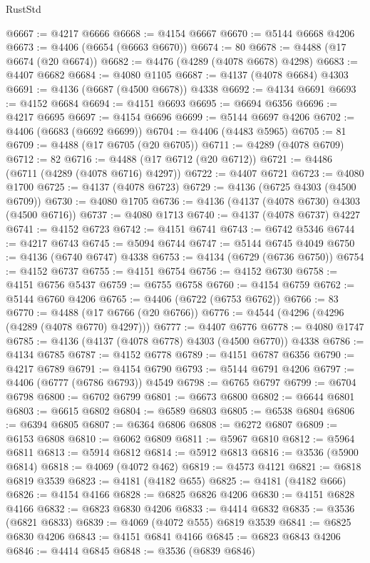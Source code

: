 \begin{lexlean}{RustStd}
\begin{coremodule}
{\begin{coremodule}
{{{{{{{{{{{{{{{{{{{{{{{{{{{{{{{{{{{{{{{{{{{{{{{{{{@6667 := @4217 @6666
@6668 := @4154 @6667
@6670 := @5144 @6668 @4206
@6673 := @4406 (@6654 (@6663 @6670))
@6674 := 80
@6678 := @4488 (@17 @6674 (@20 @6674))
@6682 := @4476 (@4289 (@4078 @6678) @4298)
@6683 := @4407 @6682
@6684 := @4080 @1105
@6687 := @4137 (@4078 @6684) @4303
@6691 := @4136 (@6687 (@4500 @6678)) @4338
@6692 := @4134 @6691
@6693 := @4152 @6684
@6694 := @4151 @6693
@6695 := @6694 @6356
@6696 := @4217 @6695
@6697 := @4154 @6696
@6699 := @5144 @6697 @4206
@6702 := @4406 (@6683 (@6692 @6699))
@6704 := @4406 (@4483 @5965)
@6705 := 81
@6709 := @4488 (@17 @6705 (@20 @6705))
@6711 := @4289 (@4078 @6709)
@6712 := 82
@6716 := @4488 (@17 @6712 (@20 @6712))
@6721 := @4486 (@6711 (@4289 (@4078 @6716) @4297))
@6722 := @4407 @6721
@6723 := @4080 @1700
@6725 := @4137 (@4078 @6723)
@6729 := @4136 (@6725 @4303 (@4500 @6709))
@6730 := @4080 @1705
@6736 := @4136 (@4137 (@4078 @6730) @4303 (@4500 @6716))
@6737 := @4080 @1713
@6740 := @4137 (@4078 @6737) @4227
@6741 := @4152 @6723
@6742 := @4151 @6741
@6743 := @6742 @5346
@6744 := @4217 @6743
@6745 := @5094 @6744
@6747 := @5144 @6745 @4049
@6750 := @4136 (@6740 @6747) @4338
@6753 := @4134 (@6729 (@6736 @6750))
@6754 := @4152 @6737
@6755 := @4151 @6754
@6756 := @4152 @6730
@6758 := @4151 @6756 @5437
@6759 := @6755 @6758
@6760 := @4154 @6759
@6762 := @5144 @6760 @4206
@6765 := @4406 (@6722 (@6753 @6762))
@6766 := 83
@6770 := @4488 (@17 @6766 (@20 @6766))
@6776 := @4544 (@4296 (@4296 (@4289 (@4078 @6770) @4297)))
@6777 := @4407 @6776
@6778 := @4080 @1747
@6785 := @4136 (@4137 (@4078 @6778) @4303 (@4500 @6770)) @4338
@6786 := @4134 @6785
@6787 := @4152 @6778
@6789 := @4151 @6787 @6356
@6790 := @4217 @6789
@6791 := @4154 @6790
@6793 := @5144 @6791 @4206
@6797 := @4406 (@6777 (@6786 @6793)) @4549
@6798 := @6765 @6797
@6799 := @6704 @6798
@6800 := @6702 @6799
@6801 := @6673 @6800
@6802 := @6644 @6801
@6803 := @6615 @6802
@6804 := @6589 @6803
@6805 := @6538 @6804
@6806 := @6394 @6805
@6807 := @6364 @6806
@6808 := @6272 @6807
@6809 := @6153 @6808
@6810 := @6062 @6809
@6811 := @5967 @6810
@6812 := @5964 @6811
@6813 := @5914 @6812
@6814 := @5912 @6813
@6816 := @3536 (@5900 @6814)
@6818 := @4069 (@4072 @462)
@6819 := @4573 @4121
@6821 := @6818 @6819 @3539
@6823 := @4181 (@4182 @655)
@6825 := @4181 (@4182 @666)
@6826 := @4154 @4166
@6828 := @6825 @6826 @4206
@6830 := @4151 @6828 @4166
@6832 := @6823 @6830 @4206
@6833 := @4414 @6832
@6835 := @3536 (@6821 @6833)
@6839 := @4069 (@4072 @555) @6819 @3539
@6841 := @6825 @6830 @4206
@6843 := @4151 @6841 @4166
@6845 := @6823 @6843 @4206
@6846 := @4414 @6845
@6848 := @3536 (@6839 @6846)
}}}}}}}}}}}}}}}}}}}}}}}}}}}}}}}}}}}}}}}}}}}}}}}}}}
\end{coremodule}}
\end{coremodule}
\end{lexlean}
